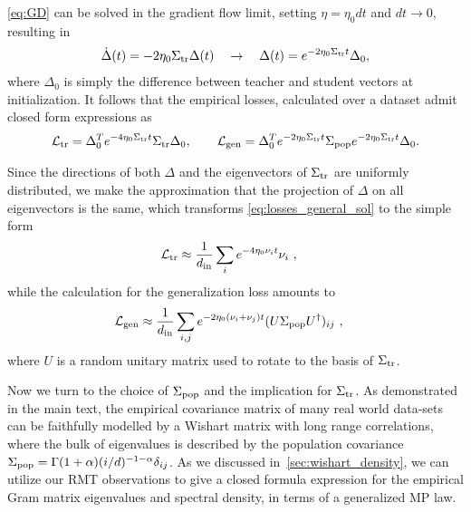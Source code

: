 \documentclass{article}
\begin{document}
\cref{eq:GD} can be solved in the gradient flow limit, setting $\eta = \eta_0 dt $ and $dt \to 0$, resulting in
\begin{align}
\label{eq:gdflow_sol}
\dot{\Delta}(t) = -2\eta_0 \Sigma_{\mathrm{tr}} \Delta(t) 
\quad\to\quad
    \Delta(t) =  e^{-2\eta_0 \Sigma_{\mathrm{tr}} t} \Delta_0,
\end{align}
where $\Delta_0$ is simply the difference between teacher and student vectors at initialization.
It follows that the empirical losses, calculated over a dataset admit closed form expressions as
\begin{align}
\label{eq:losses_general_sol}
    \mathcal{L}_{\mathrm{tr}}
    =
    \Delta_0^T e^{-4\eta_0 \Sigma_{\mathrm{tr}} t} \Sigma_{\mathrm{tr}} \Delta_0,
    \qquad
    \mathcal{L}_{\mathrm{gen}}
    =
    \Delta_0^T 
    e^{-2\eta_0 \Sigma_{\mathrm{tr}} t} 
    \Sigma_{\mathrm{pop}}
    e^{-2\eta_0 \Sigma_{\mathrm{tr}} t} 
    \Delta_0.
\end{align}


Since the directions of both $\Delta$ and the  eigenvectors of $\Sigma_{\mathrm{tr}}$ are uniformly distributed, we make the approximation that the projection of $\Delta$ on all eigenvectors is the same, which transforms \cref{eq:losses_general_sol} to the simple form
\begin{align}
\label{eq:MP_loss_sums}
   \mathcal{L}_{\mathrm{tr}} &\approx \frac{1}{d_\mathrm{in}}\sum_i e^{-4\eta_0 \nu_i  t}  \nu_i\ ,
\end{align}
while the calculation for the generalization loss amounts to
\begin{align}
\label{eq:MP_loss_sums2}
    \mathcal{L}_{\mathrm{gen}} &\approx 
    \frac{1}{d_\mathrm{in}} \sum_{i, j} e^{-2 \eta_0(\nu_i+\nu_j)  t} 
   ( U {\Sigma}_{\mathrm{pop}} U^\dagger)_{ij}
    \ ,
\end{align}
where $U$ is a random unitary matrix used to rotate to the basis of $\Sigma_{\mathrm{tr}}$.

Now we turn to the choice of $\Sigma_{\mathrm{pop}}$ and the implication for $\Sigma_{\mathrm{tr}}$. As demonstrated in the main text, the empirical covariance matrix of many real world data-sets can be faithfully modelled by a Wishart matrix with long range correlations, where the bulk of eigenvalues is described by the population covariance $\Sigma_{\mathrm{pop}} = \Gamma(1+\alpha)(i/d)^{-1-\alpha}\delta_{ij}$. As we discussed in~\cref{sec:wishart_density}, we can utilize our RMT observations to give a closed formula expression for the empirical Gram matrix eigenvalues and spectral density, in terms of a generalized MP law.
\end{document}

